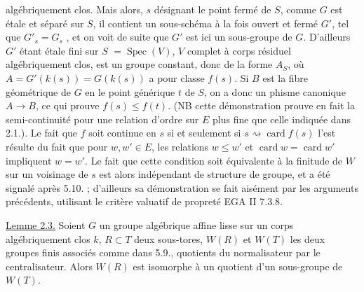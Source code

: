 
algébriquement clos. Mais alors, $s$ désignant le point fermé de $S$, comme $G$ est étale et séparé sur $S$, il contient un sous-schéma à la fois ouvert et fermé $G'$,  tel que $G'_s=G_s$ , et on voit de suite que $G'$ est ici un sous-groupe de $G$.  D'ailleurs $G'$  étant étale fini sur $S$  $=\operatorname{Spec}(V)$, $V$ complet à corps résiduel algébriquement clos, est un groupe constant, donc de la forme $A_S$, où $A=G'(k(s))=G(k(s))$ a pour classe $f(s)$.  Si $B$ est la fibre géométrique de $G$ en le point générique $t$ de $S$, on a donc un phisme canonique $A\longrightarrow B$, ce qui prouve $f(s)\leq f(t)$. (NB cette démonstration prouve en fait la semi-continuité pour une relation d'ordre sur $E$ plus fine que celle indiquée dans 2.1.). Le fait que $f$ soit continue en $s$ si et seulement si $s\rightsquigarrow\operatorname{card}f(s)$ l'est résulte du fait que pour $w,w'\in E$, les relations  $w\leq w'$ et $\operatorname{card}w=\operatorname{card}w'$ impliquent $w=w'$. Le fait que cette condition soit équivalente à  la finitude de $W$ sur un voisinage de $s$ est alors indépendant de structure de groupe, et a été signalé après  5.10. ; d'ailleurs sa démonstration  se fait aisément par les arguments précédents,  utilisant le critère valuatif de propreté EGA II 7.3.8.

\uline{Lemme 2.3.} Soient $G$ un groupe algébrique affine lisse sur un corps algébriquement clos $k$, $R\subset T$ deux sous-tores, $W(R)$ et $W(T)$ les deux groupes finis associés comme dans  5.9., quotients du normalisateur par le centralisateur. Alors $W(R)$ est isomorphe à un quotient d'un sous-groupe de $W(T)$.



